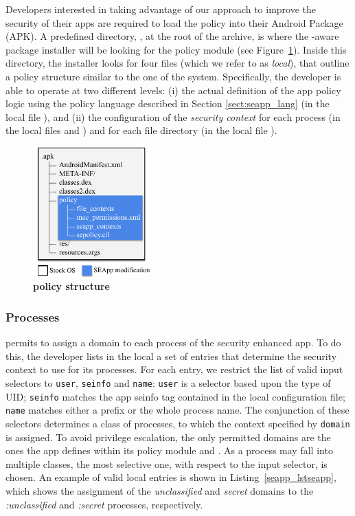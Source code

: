 Developers interested in taking advantage of our approach to improve
the security of their apps are required to load the policy into their
Android Package (APK).  A predefined directory, \apkpolicydir, at the
root of the archive, is where the \pap-aware package installer will be
looking for the policy module (see
Figure~\ref{fig:seapp_policy_folder}).  Inside this directory, the
installer looks for four files (which we refer to as {\em local}),
that outline a policy structure similar to the one of the system.
Specifically, the developer is able to operate at two different
levels: (i) the actual definition of the app policy logic using the
policy language described in Section \ref{sect:seapp_lang} (in the
local file \sepolicy), and (ii) the configuration of the {\em security
  context} for each process (in the local files \seappcontexts and
\macpermissions) and for each file directory (in the local file
\filecontexts).

\begin{figure}[t]
	\centering
	\includegraphics[width=0.4\textwidth]{chapters/seapp/figs/policy_folder}
	\caption{\bf \pap policy structure}
	\label{fig:seapp_policy_folder}
\end{figure}

\subsubsection{Processes}\label{subsub:seapp_process_control}

\pap permits to assign a \sel domain to each process of the security
enhanced app.  To do this, the developer lists in the local
\seappcontexts a set of entries that determine the security context to
use for its processes.  For each entry, we restrict the list of valid
input selectors to {\tt user}, {\tt seinfo} and {\tt name}: {\tt user}
is a selector based upon the type of UID; {\tt seinfo} matches the app
seinfo tag contained in the local \macpermissions configuration file;
{\tt name} matches either a prefix or the whole process name.  The
conjunction of these selectors determines a class of processes, to
which the context specified by {\tt domain} is assigned.  To avoid
privilege escalation, the only permitted domains are the ones the app
defines within its policy module and \untrustedapp. As a process may
fall into multiple classes, the most selective one, with respect to
the input selector, is chosen.  An example of valid local
\seappcontexts entries is shown in Listing~\ref{seapp_lstseapp}, which
shows the assignment of the {\em unclassified} and {\em secret}
domains to the {\em :unclassified} and {\em :secret} processes,
respectively.

